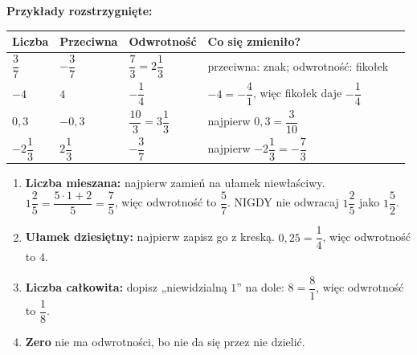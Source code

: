 \documentclass[11pt,a4paper]{article}
\begin{document}
\vspace{0.2em}
\textbf{Przykłady rozstrzygnięte:}
\begin{center}
\renewcommand{\arraystretch}{1.4}
\begin{tabular}{@{}lllll@{}}
\toprule
Liczba & Przeciwna & Odwrotność & Co się zmieniło? \\
\midrule
$\dfrac{3}{7}$ & $-\dfrac{3}{7}$ & $\dfrac{7}{3}=2\dfrac{1}{3}$ & przeciwna: znak; odwrotność: fikołek \\
$-4$ & $4$ & $-\dfrac{1}{4}$ & $-4=-\dfrac{4}{1}$, więc fikołek daje $-\dfrac{1}{4}$ \\
$0{,}3$ & $-0{,}3$ & $\dfrac{10}{3}=3\dfrac{1}{3}$ & najpierw $0{,}3=\dfrac{3}{10}$ \\
$-2\dfrac{1}{3}$ & $2\dfrac{1}{3}$ & $-\dfrac{3}{7}$ & najpierw $-2\dfrac{1}{3}=-\dfrac{7}{3}$ \\
\bottomrule
\end{tabular}
\end{center}

\begin{pulapka}
\begin{enumerate}[leftmargin=*, itemsep=2pt]
  \item \textbf{Liczba mieszana:} najpierw zamień na ułamek niewłaściwy. $1\dfrac{2}{5}=\dfrac{5\cdot 1+2}{5}=\dfrac{7}{5}$, więc odwrotność to $\dfrac{5}{7}$. NIGDY nie odwracaj $1\dfrac{2}{5}$ jako $1\dfrac{5}{2}$.
  \item \textbf{Ułamek dziesiętny:} najpierw zapisz go z kreską. $0{,}25=\dfrac{1}{4}$, więc odwrotność to $4$.
  \item \textbf{Liczba całkowita:} dopisz „niewidzialną $1$” na dole: $8=\dfrac{8}{1}$, więc odwrotność to $\dfrac{1}{8}$.
  \item \textbf{Zero} nie ma odwrotności, bo nie da się przez nie dzielić.
\end{enumerate}
\end{pulapka}
\end{document}
